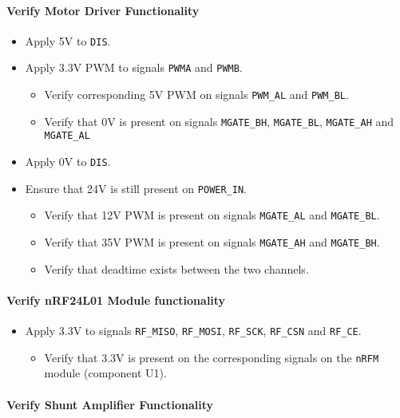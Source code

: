 \paragraph{Verify Motor Driver Functionality} %
\label{par:verify_motor_driver_functionality}
\begin{itemize}
	\item Apply 5V to \texttt{DIS}.
	\item Apply 3.3V PWM to signals \texttt{PWMA} and \texttt{PWMB}.
	\begin{itemize}
		\item Verify corresponding 5V PWM on signals \texttt{PWM\_AL} and \texttt{PWM\_BL}.
		\item Verify that 0V is present on signals \texttt{MGATE\_BH}, \texttt{MGATE\_BL}, \texttt{MGATE\_AH} and \texttt{MGATE\_AL}
	\end{itemize}
	\item Apply 0V to \texttt{DIS}.
	\item Ensure that 24V is still present on \texttt{POWER\_IN}.
	\begin{itemize}
		\item Verify that 12V PWM is present on signals \texttt{MGATE\_AL} and \texttt{MGATE\_BL}.
		\item Verify that 35V PWM is present on signals \texttt{MGATE\_AH} and \texttt{MGATE\_BH}.
		\item Verify that deadtime exists between the two channels.
	\end{itemize}
\end{itemize}
\paragraph{Verify nRF24L01 Module functionality} %
\label{par:verify_nrf24l01_module_functionality}
\begin{itemize}
	\item Apply 3.3V to signals \texttt{RF\_MISO}, \texttt{RF\_MOSI}, \texttt{RF\_SCK}, \texttt{RF\_CSN} and \texttt{RF\_CE}.
	\begin{itemize}
		\item Verify that 3.3V is present on the corresponding signals on the \texttt{nRFM} module (component U1).
	\end{itemize}
\end{itemize}

\paragraph{Verify Shunt Amplifier Functionality} %
\label{par:verify_shunt_amplifier_functionality}
